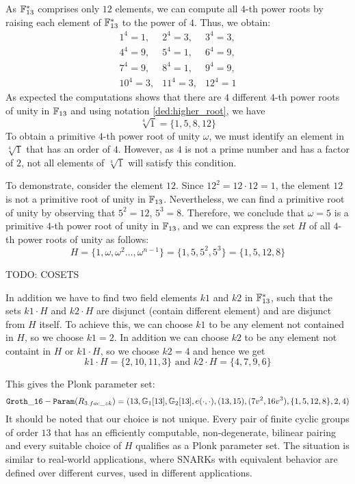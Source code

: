 \begin{example}
As $\mathbb{F}_{13}^*$ comprises only $12$ elements, we can compute all $4$-th power roots by raising each element of $\mathbb{F}_{13}^*$ to the power of $4$. Thus, we obtain:
$$
\begin{array}{lcr}
1^4= 1, &
2^4=3, &
3^4=3, \\
4^4=9, &
5^4=1, &
6^4=9,\\
7^4=9, &
8^4=1, &
9^4=9,\\
10^4=3, &
11^4=3, &
12^4=1
\end{array}
$$
As expected the computations shows that there are $4$ different $4$-th power roots of unity in $\mathbb{F}_{13}$ and using notation \ref{ded:higher_root}, we have
$$
\sqrt[4]{1}= \{1,5,8,12\}
$$
To obtain a primitive $4$-th power root of unity $\omega$, we must identify an element in $\sqrt[4]{1}$ that has an order of $4$. However, as $4$ is not a prime number and has a factor of $2$, not all elements of $\sqrt[4]{1}$ will satisfy this condition.

To demonstrate, consider the element $12$. Since $12^2=12\cdot 12 = 1$, the element $12$ is not a primitive root of unity in $\mathbb{F}_{13}$. Nevertheless, we can find a primitive root of unity by observing that $5^2=12$, $5^3=8$. Therefore, we conclude that $\omega = 5$ is a primitive $4$-th power root of unity in $\mathbb{F}_{13}$, and we can express the set $H$ of all $4$-th power roots of unity as follows:
$$
H = \{1,\omega, \omega^2 \ldots, \omega^{n-1}\} = \{1,5,5^2,5^3\} = \{1,5,12,8\}
$$

TODO: COSETS

In addition we have to find two field elements $k1$ and $k2$ in $\mathbb{F}_{13}^*$, such that the sets $k1\cdot H$ and $k2\cdot H$ are disjunct (contain different element) and are disjunct from $H$ itself. To achieve this, we can choose $k1$ to be any element not contained in $H$, so we choose $k1=2$. In addition we can choose $k2$ to be any element not containt in $H$ or $k1\cdot H$, so we choose $k2=4$ and hence we get
$$
k1\cdot H = \{2, 10, 11, 3\} \text{ and } k2\cdot H = \{4, 7, 9, 6\} 
$$ 

This gives the Plonk parameter set:
$$
\mathtt{Groth\_16-Param}(R_{3.fac\_zk})=(13, \mathbb{G}_1[13], \mathbb{G}_2[13], e(\cdot,\cdot), (13,15),(7v^2,16v^3), \{1,5, 12, 8\}, 2, 4)
$$
It should be noted that our choice is not unique. Every pair of finite cyclic groups of order $13$ that has an efficiently computable, non-degenerate, bilinear pairing and every suitable choice of $H$ qualifies as a Plonk parameter set. The situation is similar to real-world applications, where SNARKs with equivalent behavior are defined over different curves, used in different applications.


\end{example}
